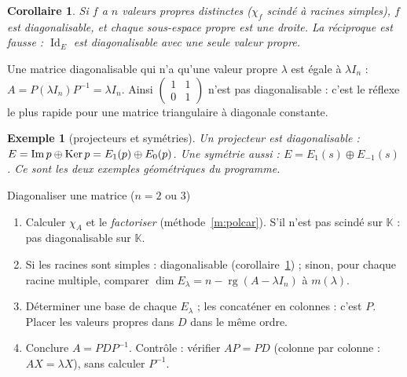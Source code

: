 \documentclass[a4paper,11pt]{article}
\numberwithin{equation}{section}
\numberwithin{figure}{section}
\numberwithin{table}{section}
\theoremstyle{enonce}
\newtheorem{corollaire}[definition]{Corollaire}
\theoremstyle{exemple}
\newtheorem{exemple}[definition]{Exemple}
\theoremstyle{remarque}
\newcommand{\K}{\mathbb{K}}
\newcommand{\rg}{\operatorname{rg}}
\newcommand{\Id}{\operatorname{Id}}
\begin{document}
\begin{corollaire}\label{c:distinctes}
Si $f$ a $n$ valeurs propres distinctes ($\chi_f$ scindé à racines simples), $f$ est diagonalisable, et chaque sous-espace propre
est une droite. La réciproque est fausse : $\Id_E$ est diagonalisable avec une seule valeur propre.
\end{corollaire}

\begin{reflexe}
Une matrice diagonalisable qui n'a qu'une valeur propre $\lambda$ est égale à $\lambda I_n$ : $A=P(\lambda I_n)P^{-1}=\lambda I_n$.
Ainsi $\begin{pmatrix}1&1\\0&1\end{pmatrix}$ n'est pas diagonalisable : c'est le réflexe le plus rapide pour une matrice
triangulaire à diagonale constante.
\end{reflexe}

\begin{exemple}[projecteurs et symétries]
Un projecteur est diagonalisable : $E=\operatorname{Im} p\oplus\operatorname{Ker} p=E_1(p)\oplus E_0(p)$. Une symétrie aussi :
$E=E_1(s)\oplus E_{-1}(s)$. Ce sont les deux exemples géométriques du programme.
\end{exemple}

\begin{methode}{Diagonaliser une matrice ($n=2$ ou $3$)}\label{m:diag}
\begin{enumerate}
\item Calculer $\chi_A$ et le \emph{factoriser} (méthode~\ref{m:polcar}). S'il n'est pas scindé sur $\K$ : pas diagonalisable sur $\K$.
\item Si les racines sont simples : diagonalisable (corollaire~\ref{c:distinctes}) ; sinon, pour chaque racine multiple, comparer
$\dim E_\lambda=n-\rg(A-\lambda I_n)$ à $m(\lambda)$.
\item Déterminer une base de chaque $E_\lambda$ ; les concaténer en colonnes : c'est $P$. Placer les valeurs propres dans $D$ dans
le même ordre.
\item Conclure $A=PDP^{-1}$. Contrôle : vérifier $AP=PD$ (colonne par colonne : $AX=\lambda X$), sans calculer $P^{-1}$.
\end{enumerate}
\end{methode}
\end{document}

